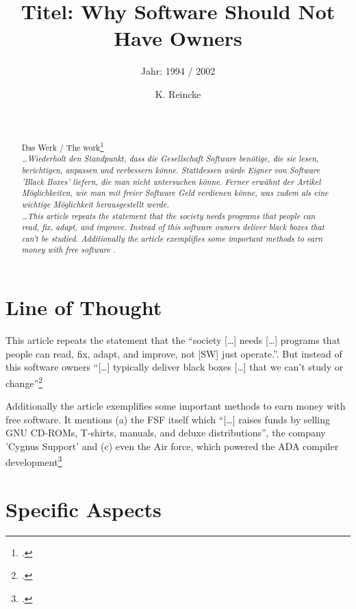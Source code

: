 \documentclass[DIV=calc,BCOR=5mm,11pt,headings=small,oneside,abstract=true, toc=bib]{scrartcl}
\begin{document}

\titlehead{Literaturexzerpt}
\subject{Autor(en): Stallman / Stallman1994a}
\title{Titel: Why Software Should Not Have Owners}
\subtitle{Jahr: 1994 / 2002 }
\author{K. Reincke}

\maketitle

\begin{abstract}
\noindent
\cite[(in:)][]{StaGay2002a} \\
\noindent
\cite[(ist:)][]{Stallman1994a} \\
Das Werk / The work\footcite[][]{Stallman1994a} \\
\noindent \itshape
\ldots  Wiederholt den Standpunkt, dass die Gesellschaft Software benötige, die
sie lesen, berichtigen, anpassen und verbessern könne. Stattdessen würde Eigner
von Software 'Black Boxes' liefern, die man nicht untersuchen könne. Ferner
erwähnt der Artikel Möglichkeiten, wie man mit freier Software Geld verdienen
könne, was zudem als eine wichtige Möglichkeit herausgestellt werde.
\\
\noindent
\ldots This article repeats the statement that the society needs programs that
people can read, fix, adapt, and improve. Instead of this software owners
deliver black boxes that can't be studied. Additionally the article exemplifies
some important methods to earn money with free software .
\end{abstract}
\footnotesize
\normalsize

\section{Line of Thought}

This article repeats the statement that the \enquote{society [\ldots] needs
[\ldots] programs that people can read, fix, adapt, and improve, not [SW] just
operate.}. But instead of this software owners \enquote{[\ldots]
typically deliver black boxes [\ldots] that we can't study or
change}\footcite[cf.][47f]{Stallman1994a}

 Additionally the article exemplifies some important methods to earn money with
 free software. It mentions (a) the FSF itself which \enquote{[\ldots] raises
 funds by selling GNU CD-ROMs, T-shirts, manuals, and deluxe
 distributions}, the company 'Cygnus Support' and (c) even the Air force,
 which powered the ADA compiler development\footcite[cf.][48]{Stallman1994a}
 
 

\section{Specific Aspects}

\small

\end{document}
